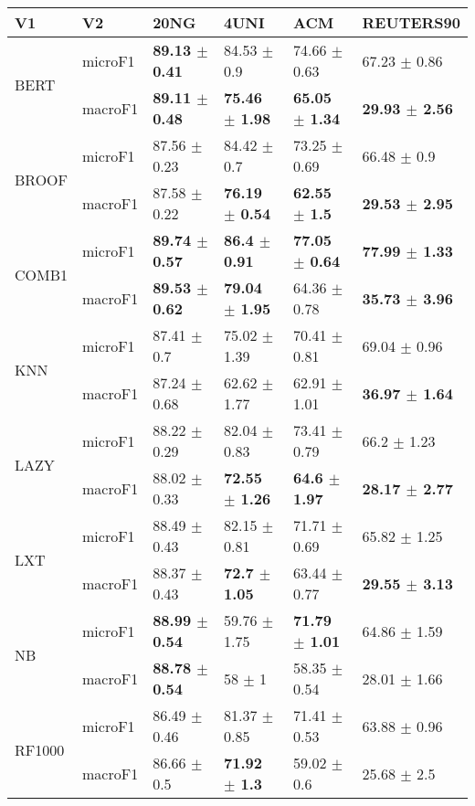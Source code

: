 \documentclass[]{article}
\begin{document}
\begin{table}[ht]
\centering
\begin{tabular}{llllll}
  \hline
V1 & V2 & 20NG & 4UNI & ACM & REUTERS90 \\ 
  \hline
\multirow{2}{*}{BERT} & microF1 & \bf{89.13 $\pm$  0.41} & 84.53 $\pm$  0.9 & 74.66 $\pm$  0.63 & 67.23 $\pm$  0.86 \\ 
   & macroF1 & \bf{89.11 $\pm$  0.48} & \bf{75.46 $\pm$  1.98} & \bf{65.05 $\pm$  1.34} & \bf{29.93 $\pm$  2.56} \\ 
  \multirow{2}{*}{BROOF} & microF1 & 87.56 $\pm$  0.23 & 84.42 $\pm$  0.7 & 73.25 $\pm$  0.69 & 66.48 $\pm$  0.9 \\ 
   & macroF1 & 87.58 $\pm$  0.22 & \bf{76.19 $\pm$  0.54} & \bf{62.55 $\pm$  1.5} & \bf{29.53 $\pm$  2.95} \\ 
  \multirow{2}{*}{COMB1} & microF1 & \bf{89.74 $\pm$  0.57} & \bf{86.4 $\pm$  0.91} & \bf{77.05 $\pm$  0.64} & \bf{77.99 $\pm$  1.33} \\ 
   & macroF1 & \bf{89.53 $\pm$  0.62} & \bf{79.04 $\pm$  1.95} & 64.36 $\pm$  0.78 & \bf{35.73 $\pm$  3.96} \\ 
  \multirow{2}{*}{KNN} & microF1 & 87.41 $\pm$  0.7 & 75.02 $\pm$  1.39 & 70.41 $\pm$  0.81 & 69.04 $\pm$  0.96 \\ 
   & macroF1 & 87.24 $\pm$  0.68 & 62.62 $\pm$  1.77 & 62.91 $\pm$  1.01 & \bf{36.97 $\pm$  1.64} \\ 
  \multirow{2}{*}{LAZY} & microF1 & 88.22 $\pm$  0.29 & 82.04 $\pm$  0.83 & 73.41 $\pm$  0.79 & 66.2 $\pm$  1.23 \\ 
   & macroF1 & 88.02 $\pm$  0.33 & \bf{72.55 $\pm$  1.26} & \bf{64.6 $\pm$  1.97} & \bf{28.17 $\pm$  2.77} \\ 
  \multirow{2}{*}{LXT} & microF1 & 88.49 $\pm$  0.43 & 82.15 $\pm$  0.81 & 71.71 $\pm$  0.69 & 65.82 $\pm$  1.25 \\ 
   & macroF1 & 88.37 $\pm$  0.43 & \bf{72.7 $\pm$  1.05} & 63.44 $\pm$  0.77 & \bf{29.55 $\pm$  3.13} \\ 
  \multirow{2}{*}{NB} & microF1 & \bf{88.99 $\pm$  0.54} & 59.76 $\pm$  1.75 & \bf{71.79 $\pm$  1.01} & 64.86 $\pm$  1.59 \\ 
   & macroF1 & \bf{88.78 $\pm$  0.54} & 58 $\pm$  1 & 58.35 $\pm$  0.54 & 28.01 $\pm$  1.66 \\ 
  \multirow{2}{*}{RF1000} & microF1 & 86.49 $\pm$  0.46 & 81.37 $\pm$  0.85 & 71.41 $\pm$  0.53 & 63.88 $\pm$  0.96 \\ 
   & macroF1 & 86.66 $\pm$  0.5 & \bf{71.92 $\pm$  1.3} & 59.02 $\pm$  0.6 & 25.68 $\pm$  2.5 \\ 

\end{tabular}
\end{table}
\end{document}
